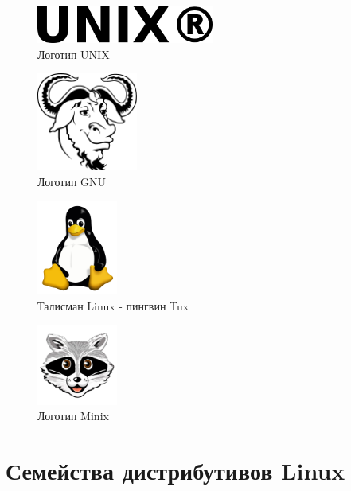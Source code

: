 \documentclass[bachelor, och, referat, times]{SCWorks}
\begin{document}
\begin{figure}[h]
    \centering
    \includegraphics[width=220px]{UNIX.png}
    \caption{Логотип UNIX}
    \label{fig:UNIX_symbol}
\end{figure}

\begin{figure}[h]
    \centering
    \includegraphics[width=125px]{128px-Heckert_GNU_white.png}
    \caption{Логотип GNU}
    \label{fig:GNU_symbol}
\end{figure}




\begin{figure}[t]
    \centering
    \includegraphics[width=100px]{Tux.png}
    \caption{Талисман Linux - пингвин Tux}
    \label{fig:linux_symbol}
\end{figure}

\begin{figure}[t]
    \centering
    \includegraphics[width=100px]{BVXyPwe.png}
    \caption{Логотип Minix}
    \label{fig:minix_symbol}
\end{figure}

\section{Семейства дистрибутивов Linux}
\end{document}
